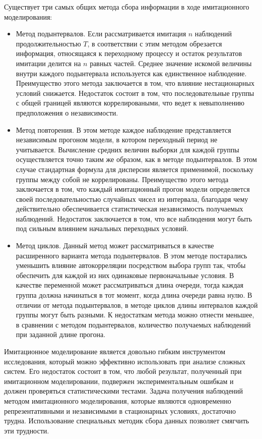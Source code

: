 Существует три самых общих метода сбора информации в ходе имитационного
моделирования:
\begin{itemize}
\item Метод подынтервалов. 
Если рассматривается имитация $n$ наблюдений продолжительностью $T$, в соответствии с этим методом обрезается информация, относящаяся к переходному процессу и остаток результатов имитации делится на $n$ равных частей. 
Среднее значение искомой величины внутри каждого подынтервала используется как единственное наблюдение.
Преимущество этого метода заключается в том, что влияние нестационарных условий снижается. 
Недостаток состоит в том, что последовательные группы с общей границей являются коррелироваными, что ведет к невыполнению предположения о независимости.

\item Метод повторения. 
В этом методе каждое наблюдение представляется независимым прогоном модели, в котором переходный период не учитывается. 
Вычисление средних величин выборки для каждой группы осуществляется точно таким же образом, как в методе подынтервалов.
В этом случае стандартная формула для дисперсии является применимой, поскольку группы между собой не коррелированы.
Преимущество этого метода заключается в том, что каждый имитационный прогон модели определяется своей последовательностью случайных чисел из интервала, благодаря чему действительно обеспечивается статистическая независимость получаемых наблюдений.
Недостаток заключается в том, что все наблюдения могут быть под сильным влиянием начальных переходных условий.

\item Метод циклов.
Данный метод может рассматриваться в качестве расширенного варианта метода подынтервалов.
В этом методе постарались уменьшить влияние автокорреляции посредством выбора групп так, чтобы обеспечить для каждой из них одинаковые первоначальные условия. 
В качестве переменной может рассматриваться длина очереди, тогда каждая группа должна начинаться в тот момент, когда длина очереди равна нулю. 
В отличии от метода подынтервалов, в методе циклов длины интервалов каждой группы могут быть разными.
К недостаткам метода можно отнести меньшее, в сравнении с методом подынтервалов, количество получаемых наблюдений при заданной длине прогона.

\end{itemize}

Имитационное моделирование является довольно гибким инструментом исследования, который можно эффективно использовать при анализе сложных систем.
Его недостаток состоит в том, что любой результат, полученный при имитационном моделировании, подвержен экспериментальным ошибкам и должен проверяться статистическими тестами. 
Задача получения наблюдений методом имитационного моделирования, которые являются одновременно репрезентативными и независимыми в стационарных условиях, достаточно трудна. 
Использование специальных методик сбора данных позволяет смягчить эти трудности.

